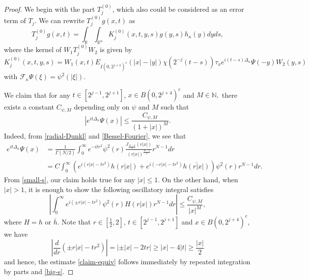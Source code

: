 \documentclass[a4paper,11pt, reqno]{amsart}
\numberwithin{equation}{section}
\theoremstyle{plain}
\theoremstyle{definition}
\theoremstyle{remark}
\begin{document}
\begin{proof}
We begin with the part $T^{(0)}_j$, which also could be considered as an error term of $T_j$. We  can rewrite $T^{(0)}_jg(x,t)$ as 
\begin{equation*}
T^{(0)}_jg(x,t)=\int_\mathbb{R}\int_{\mathbb{R}^n}K^{(0)}_j(x,t,y,s) g(y,s)h_\kappa(y)dyds,
\end{equation*}
where the kernel of $W_1T^{(0)}_j W_2$ is given by
\begin{equation}\label{KernelWTW}
    K^{(0)}_j(x,t,y,s)=W_1(x,t)E_{I(0,2^{j+4})^c}(|x|-|y|)\chi\left(2^{-j}(t-s)\right)\tau_xe^{i(t-s)\Delta_\kappa} \Psi(-y)W_2(y,s)
\end{equation}
with $\mathcal{F}_\kappa \Psi(\xi)=\psi^2(|\xi|)$.


We claim that for any $t\in [2^{j-1},2^{j+1}]$, $x\in B(0,2^{j+4})^c$ and $M\in\mathbb{N},$ there exists a constant $C_{\psi,M}$ depending only on $\psi$ and $M$ such that
\begin{equation}\label{claim}
    \left|e^{it\Delta_\kappa} \Psi(x)\right|\leq  \frac{C_{\psi,M}}{(1+|x|)^M}.
\end{equation}
Indeed, from \eqref{radial-Dunkl} and \eqref{Bessel-Fourier}, we see that
\begin{align*}
    e^{it\Delta_\kappa} \Psi(x)&=\frac{1}{\Gamma(N/2)}\int_0^\infty e^{-itr^2}\psi^2(r)\frac{J_\frac{N-2}{2}(r|x|)}{\left(r|x|\right)^\frac{N-2}{2}}r^{N-1} dr\\
    &= C \int_0^\infty \left(e^{i(r|x|-tr^2)}h(r|x|)+e^{i(-r|x|-tr^2)}\overline{h(r|x|)}\right)\psi^2(r)r^{N-1} dr.
\end{align*}
From \eqref{small-s}, our claim holds true for any $|x|\leq 1$.  On the other hand, when $|x|>1$, it is enough to show the following oscillatory integral satisfies
\begin{equation}\label{claim-equiv}
\left|\int_0^\infty e^{i\left(\pm r|x|-tr^2\right)}\psi^2(r)H(r|x|)r^{N-1}dr\right|\leq  \frac{C_{\psi,M}}{|x|^M},
\end{equation}
where $H=h$ or $\overline{h}$. Note that $r\in[\frac{1}{2},2]$, $t\in [2^{j-1},2^{j+1}]$ and $x\in B(0,2^{j+4})^c$, we have 
\begin{equation*}
    \left|\frac{d}{dr}\left(\pm r|x|-tr^2\right)\right|=\left|\pm |x|-2tr\right|\geq |x|-4|t|\geq \frac{|x|}{2}
\end{equation*}
and hence, the estimate  \eqref{claim-equiv} follows immediately by repeated integration by parts and \eqref{big-s}.



\end{proof}
\end{document}
